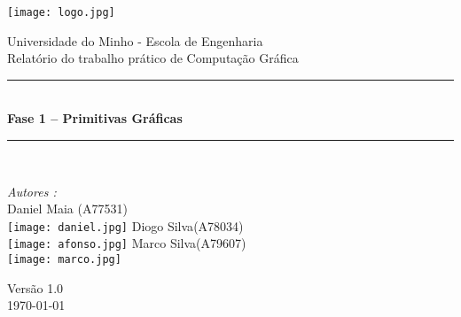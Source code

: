 \documentclass[a4paper]{article}
\begin{document}
\begin{titlepage}
\begin{center}


\texttt{[image: logo.jpg]}\\[0.5cm]

\vspace{10mm}

{\huge Universidade do Minho - Escola de Engenharia}\\[0.5cm]

{\large Relatório do trabalho prático de Computação Gráfica}\\[0.5cm]

\vspace{10mm}

\rule{\linewidth}{0.5mm} \\[0.4cm]
{ \huge \bfseries Fase 1 – Primitivas Gráficas \\[0.4cm] }
\rule{\linewidth}{0.5mm} \\[1.5cm]

\noindent
\begin{minipage}{0.4\textwidth}
  \begin{flushleft} \large
    \emph{Autores :}\\
    Daniel Maia \textsc{(A77531)}\\
    \texttt{[image: daniel.jpg]}\break
    Diogo Silva\textsc{(A78034)}\\
    \texttt{[image: afonso.jpg]}\break
    Marco Silva\textsc{(A79607)}\\
    \texttt{[image: marco.jpg]}\break
  \end{flushleft}
\end{minipage}%
\vfill

{\large Versão 1.0 \\ \today}

\end{center}
\end{titlepage}


\begin{abstract}

\hspace{3mm}

\end{abstract}

\pagebreak
\tableofcontents

\pagebreak

\end{document}
